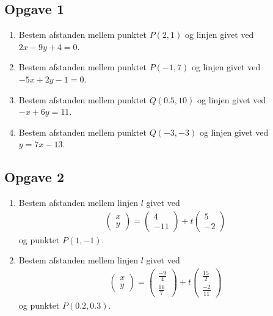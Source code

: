 \subsection*{Opgave 1}
\begin{enumerate}[label=\roman*)]
	\item Bestem afstanden mellem punktet $P(2,1)$ og linjen givet ved $2x-9y +4 = 0$. 
	\item Bestem afstanden mellem punktet $P(-1,7)$ og linjen givet ved $-5x+2y -1 = 0$.
	\item Bestem afstanden mellem punktet $Q(0.5,10)$ og linjen givet ved $-x+6y = 11$.
	\item Bestem afstanden mellem punktet $Q(-3,-3)$ og linjen givet ved $y = 7x - 13$.
\end{enumerate}

\subsection*{Opgave 2}
\begin{enumerate}[label=\roman*)]
	\item Bestem afstanden mellem linjen $l$ givet ved
	\begin{align*}
		\begin{pmatrix}
			x \\ y 
		\end{pmatrix}
		=
		\begin{pmatrix}
			4 \\ -11
		\end{pmatrix}
		+ t
		\begin{pmatrix}
			5 \\ -2
		\end{pmatrix}
	\end{align*}
	og punktet $P(1,-1)$.
	\item Bestem afstanden mellem linjen $l$ givet ved
	\begin{align*}
			\begin{pmatrix}
			x \\ y 
		\end{pmatrix}
		=
		\begin{pmatrix}
			\frac{-9}{4} \\ \frac{16}{7}
		\end{pmatrix}
		+ t
		\begin{pmatrix}
			\frac{15}{2} \\ \frac{-2}{11}
		\end{pmatrix}
	\end{align*}
	og punktet $P(0.2,0.3)$.
\end{enumerate}

